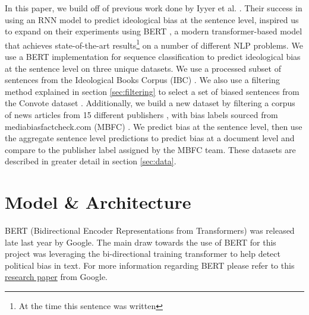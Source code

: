 \documentclass[10pt,a4paper,onecolumn]{article}
\begin{document}
In this paper, we build off of previous work done by Iyyer et al. \cite{iyyerRNN}. Their success in using an RNN model to predict ideological bias at the sentence level, inspired us to expand on their experiments using BERT \cite{bert}, a modern transformer-based model that achieves state-of-the-art results\footnote{At the time this sentence was written} on a number of different NLP problems. We use a BERT implementation for sequence classification to predict ideological bias at the sentence level on three unique datasets. We use a processed subset of sentences from the Ideological Books Corpus (IBC) \cite{gross2013ibc}. We also use a filtering method explained in section \ref{sec:filtering} to select a set of biased sentences from the Convote dataset \cite{convote}. Additionally, we build a new dataset by filtering a corpus of news articles from 15 different publishers \cite{news}, with bias labels sourced from mediabiasfactcheck.com (MBFC) \cite{mbfc}. We predict bias at the sentence level, then use the aggregate sentence level predictions to predict bias at a document level and compare to the publisher label assigned by the MBFC team. These datasets are described in greater detail in section \ref{sec:data}.

\section{Model \& Architecture}
BERT (Bidirectional Encoder Representations from Transformers) was released late last year by Google. The main draw towards the use of BERT for this project was leveraging the bi-directional training transformer to help detect political bias in text. For more information regarding BERT please refer to this \href{https://arxiv.org/abs/1810.04805}{research paper} from Google.
\end{document}

